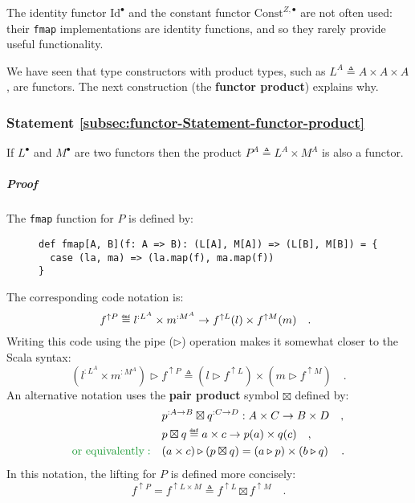 The identity functor $\text{Id}^{\bullet}$ and the constant functor
$\text{Const}^{Z,\bullet}$ are not often used: their \lstinline!fmap!
implementations are identity functions, and so they rarely provide
useful functionality. 

We have seen that type constructors with product types, such as $L^{A}\triangleq A\times A\times A$,
are functors. The next construction (the \textbf{functor
product}) explains why.

\subsubsection{Statement \label{subsec:functor-Statement-functor-product}\ref{subsec:functor-Statement-functor-product}}

If $L^{\bullet}$ and $M^{\bullet}$ are two functors then the product
$P^{A}\triangleq L^{A}\times M^{A}$ is also a functor.

\subparagraph{Proof}

The \lstinline!fmap! function for $P$ is defined by:

\begin{wrapfigure}{l}{0.595\columnwidth}%
\vspace{-0.9\baselineskip}
\begin{lstlisting}
def fmap[A, B](f: A => B): (L[A], M[A]) => (L[B], M[B]) = {
  case (la, ma) => (la.map(f), ma.map(f))
}
\end{lstlisting}

\vspace{-1.5\baselineskip}
\end{wrapfigure}%

\noindent The corresponding code notation is:
\[
\negthickspace\negthickspace f^{\uparrow P}\triangleq l^{:L^{A}}\times m^{:M^{A}}\rightarrow f^{\uparrow L}(l)\times f^{\uparrow M}(m)\quad.
\]
Writing this code using the pipe ($\triangleright$) operation makes
it somewhat closer to the Scala syntax:
\begin{equation}
(l^{:L^{A}}\times m^{:M^{A}})\triangleright f^{\uparrow P}\triangleq(l\triangleright f^{\uparrow L})\times(m\triangleright f^{\uparrow M})\quad.\label{eq:f-def-of-functor-product-lift}
\end{equation}
An alternative notation uses the \textbf{pair
product} symbol $\boxtimes$ defined by:
\begin{align*}
 & p^{:A\rightarrow B}\boxtimes q^{:C\rightarrow D}:A\times C\rightarrow B\times D\quad,\\
 & p\boxtimes q\triangleq a\times c\rightarrow p(a)\times q(c)\quad,\\
{\color{greenunder}\text{or equivalently}:}\quad & (a\times c)\triangleright\left(p\boxtimes q\right)=\left(a\triangleright p\right)\times\left(b\triangleright q\right)\quad.
\end{align*}
In this notation, the lifting for $P$ is defined more concisely:
\begin{equation}
f^{\uparrow P}=f^{\uparrow L\times M}\triangleq f^{\uparrow L}\boxtimes f^{\uparrow M}\quad.\label{eq:def-of-functor-product-fmap}
\end{equation}

